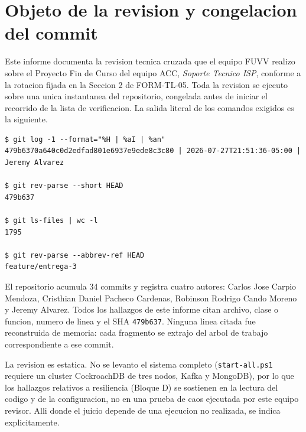 \documentclass[10pt,a4paper]{article}
\newcommand{\commitCorto}{479b637}
\begin{document}
\tableofcontents
\newpage

\section{Objeto de la revision y congelacion del commit}

Este informe documenta la revision tecnica cruzada que el equipo FUVV realizo sobre el
Proyecto Fin de Curso del equipo ACC, \emph{Soporte Tecnico ISP}, conforme a la rotacion
fijada en la Seccion 2 de FORM-TL-05. Toda la revision se ejecuto sobre una unica
instantanea del repositorio, congelada antes de iniciar el recorrido de la lista de
verificacion. La salida literal de los comandos exigidos es la siguiente.

\begin{lstlisting}[caption={Comandos de verificacion del objeto revisado (Fase F1)},label={lst:git},numbers=none]
$ git log -1 --format="%H | %aI | %an"
479b6370a640c0d2edfad801e6937e9ede8c3c80 | 2026-07-27T21:51:36-05:00 | Jeremy Alvarez

$ git rev-parse --short HEAD
479b637

$ git ls-files | wc -l
1795

$ git rev-parse --abbrev-ref HEAD
feature/entrega-3
\end{lstlisting}

El repositorio acumula 34 commits y registra cuatro autores: Carlos Jose Carpio Mendoza,
Cristhian Daniel Pacheco Cardenas, Robinson Rodrigo Cando Moreno y Jeremy Alvarez. Todos
los hallazgos de este informe citan archivo, clase o funcion, numero de linea y el SHA
\texttt{\commitCorto}. Ninguna linea citada fue reconstruida de memoria: cada fragmento se
extrajo del arbol de trabajo correspondiente a ese commit.

\begin{tcolorbox}[colback=white,colframe=black!35,title=\textbf{Alcance y limitaciones declaradas}]
La revision es estatica. No se levanto el sistema completo (\texttt{start-all.ps1} requiere
un cluster CockroachDB de tres nodos, Kafka y MongoDB), por lo que los hallazgos relativos
a resiliencia (Bloque D) se sostienen en la lectura del codigo y de la configuracion, no en
una prueba de caos ejecutada por este equipo revisor. Alli donde el juicio depende de una
ejecucion no realizada, se indica explicitamente.
\end{tcolorbox}

\end{document}
